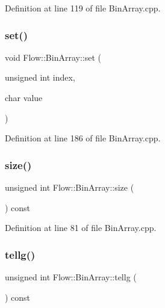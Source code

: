 Definition at line 119 of file Bin\+Array.\+cpp.

\hypertarget{class_flow_1_1_bin_array_abace37ef0e954eec574b19a1f2560991}{}\label{class_flow_1_1_bin_array_abace37ef0e954eec574b19a1f2560991} 
\subsubsection{\texorpdfstring{set()}{set()}}
{\footnotesize\ttfamily void Flow\+::\+Bin\+Array\+::set (\begin{DoxyParamCaption}\item[{unsigned int}]{index,  }\item[{char}]{value }\end{DoxyParamCaption})}



Definition at line 186 of file Bin\+Array.\+cpp.

\hypertarget{class_flow_1_1_bin_array_af0431a608e20947b0401d90aebd7c5ef}{}\label{class_flow_1_1_bin_array_af0431a608e20947b0401d90aebd7c5ef} 
\subsubsection{\texorpdfstring{size()}{size()}}
{\footnotesize\ttfamily unsigned int Flow\+::\+Bin\+Array\+::size (\begin{DoxyParamCaption}{ }\end{DoxyParamCaption}) const}



Definition at line 81 of file Bin\+Array.\+cpp.

\hypertarget{class_flow_1_1_bin_array_ab1a912bdb067a3eaae6d6a3081aa4951}{}\label{class_flow_1_1_bin_array_ab1a912bdb067a3eaae6d6a3081aa4951} 
\subsubsection{\texorpdfstring{tellg()}{tellg()}}
{\footnotesize\ttfamily unsigned int Flow\+::\+Bin\+Array\+::tellg (\begin{DoxyParamCaption}{ }\end{DoxyParamCaption}) const}



